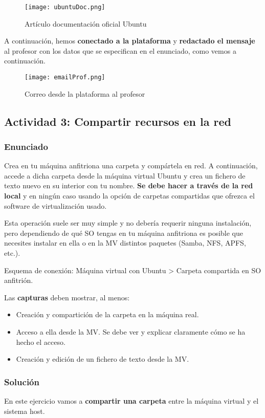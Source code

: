 \begin{figure}[H]
    \centering
    \texttt{[image: ubuntuDoc.png]}
    \caption{Artículo documentación oficial Ubuntu}
\end{figure}

A continuación, hemos \textbf{conectado a la plataforma} y \textbf{redactado el mensaje} al profesor con los datos que se especifican en el enunciado, como vemos a continuación.

\begin{figure}[H]
    \centering
    \texttt{[image: emailProf.png]}
    \caption{Correo desde la plataforma al profesor}
\end{figure}

\subsection{Actividad 3: Compartir recursos en la red}

\subsubsection{Enunciado}
Crea en tu máquina anfitriona una carpeta y compártela en red. A continuación, accede a dicha carpeta desde la máquina virtual Ubuntu y crea un fichero de texto nuevo en su interior con tu nombre. \textbf{Se debe hacer a través de la red local} y en ningún caso usando la opción de carpetas compartidas que ofrezca el software de virtualización usado.

Esta operación suele ser muy simple y no debería requerir ninguna instalación, pero dependiendo de qué SO tengas en tu máquina anfitriona es posible que necesites instalar en ella o en la MV distintos paquetes (Samba, NFS, APFS, etc.).

Esquema de conexión: Máquina virtual con Ubuntu > Carpeta compartida en SO anfitrión.

Las \textbf{capturas} deben mostrar, al menos:

\begin{itemize}
    \item Creación y compartición de la carpeta en la máquina real.
    \item Acceso a ella desde la MV. Se debe ver y explicar claramente cómo se ha hecho el acceso.
    \item Creación y edición de un fichero de texto desde la MV.
\end{itemize}

\subsubsection{Solución}
En este ejercicio vamos a \textbf{compartir una carpeta} entre la máquina virtual y el sistema host.

